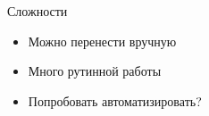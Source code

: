 \documentclass[12pt]{beamer}
\begin{document}
{
\begin{frame}{Сложности}
\begin{mybox}[]
\begin{itemize}
	\item Можно перенести вручную
	\item Много рутинной работы
	\item Попробовать автоматизировать?
\end{itemize}
\end{mybox}
\end{frame}
}
\end{document}
